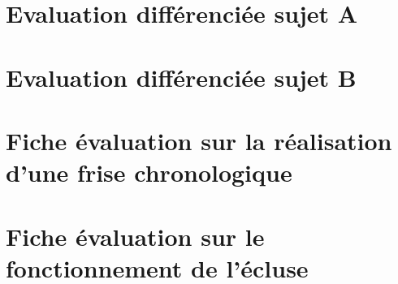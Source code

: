 
\section{Evaluation différenciée sujet A}\label{annexe:evaluation_chaine_energie_A}

\section{Evaluation différenciée sujet B}\label{annexe:evaluation_chaine_energie_B}

\section{Fiche évaluation sur la réalisation d'une frise chronologique}\label{annexe:evaluation_frise}

\section{Fiche évaluation sur le fonctionnement de l'écluse}\label{annexe:evaluation_fct_ecluse}

